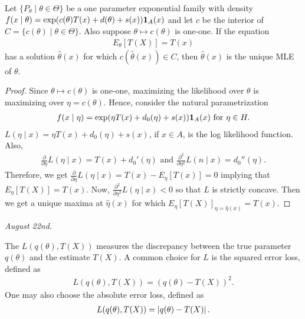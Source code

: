 \begin{theorem}
    Let $\{P_{\theta} \mid \theta \in \Theta\}$ be a one parameter exponential family with density $f(x \mid \theta) = \exp(c(\theta)T(x) + d(\theta) + s(x))\textbf{1}_{A}(x)$ and let $c$ be the interior of $C = \{c(\theta) \mid \theta \in \Theta\}$. Also suppose $\theta \mapsto c(\theta)$ is one-one. If the equation
    \begin{align}
        E_{\theta}[T(X)] = T(x)
    \end{align}
    has a solution $\hat{\theta}(x)$ for which $c(\hat{\theta}(x)) \in C$, then $\hat{\theta}(x)$ is the unique MLE of $\theta$.
\end{theorem}
\begin{proof}
    Since $\theta \mapsto c(\theta)$ is one-one, maximizing the likelihood over $\theta$ is maximizing over $\eta = c(\theta)$. Hence, consider the natural parametrization
    \begin{align}
        f(x \mid \eta) = \exp(\eta T(x) + d_{0}(\eta) + s(x))\textbf{1}_{A}(x) \text{ for } \eta \in H.
    \end{align}
    $L(\eta \mid x) = \eta T(x) + d_{0}(\eta) + s(x)$, if $x \in A$, is the log likelihood function. Also,
    \begin{align}
        \frac{\partial}{\partial \eta} L(\eta \mid x) = T(x) + d_{0}'(\eta) \text{ and } \frac{\partial^{2}}{\partial \eta^{2}} L(n \mid x) = d_{0}''(\eta).
    \end{align}
    Therefore, we get $\frac{\partial}{\partial \eta} L(\eta \mid x) = T(x) - E_{\eta}[T(x)] = 0$ implying that $E_{\eta}[T(X)] = T(x)$. Now, $\frac{\partial^{2}}{\partial \eta^{2}} L(\eta \mid x) < 0$ so that $L$ is strictly concave. Then we get a unique maxima at $\hat{\eta}(x)$ for which $E_{\eta}[T(X)]_{\eta = \hat{\eta}(x)} = T(x)$.
\end{proof}

\noindent \textit{August 22nd.}

The  $L(q(\theta),T(X))$ measures the discrepancy between the true parameter $q(\theta)$ and the estimate $T(X)$. A common choice for $L$ is the squared error loss, defined as
\begin{align}
    L(q(\theta),T(X)) = (q(\theta) - T(X))^{2}.
\end{align}
One may also choose the absolute error loss, defined as
\begin{align}
    L(q(\theta),T(X)) = \left| q(\theta) - T(X) \right|.
\end{align}


